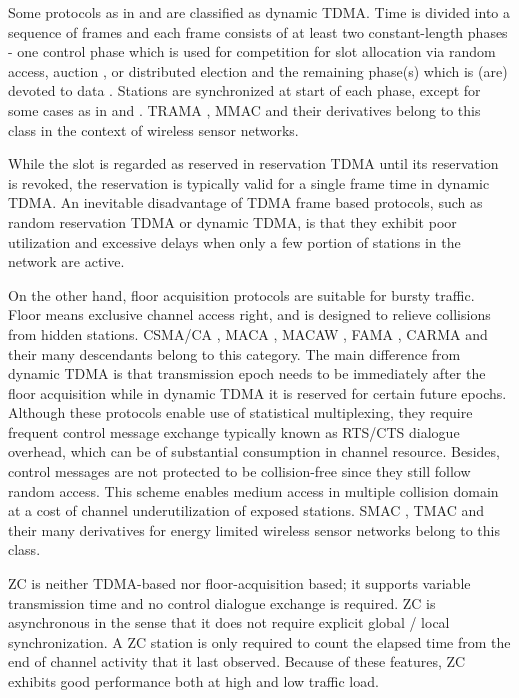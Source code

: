 \documentclass{acm_proc_article-sp}
\begin{document}
Some protocols as in \cite{1983FALK} and \cite{1993WILSON} are classified as dynamic TDMA. Time is divided into a sequence of frames and each frame consists of at least two constant-length phases - one control phase which is used for competition for slot allocation via random access, auction \cite{1994RAMA} \cite{2002MICIC} \cite{2003CSMAIC}, or distributed election \cite{2003RAJENDRAN} and the remaining phase(s) which is (are) devoted to data \cite{1993WILSON}. Stations are synchronized at start of each phase, except for some cases as in \cite{2005MMAC} and \cite{1990ZHANG}. TRAMA \cite{2003RAJENDRAN}, MMAC \cite{2005MMAC} and their derivatives belong to this class in the context of wireless sensor networks.

While the slot is regarded as reserved in reservation TDMA until its reservation is revoked, the reservation is typically valid for a single frame time in dynamic TDMA. An inevitable disadvantage of TDMA frame based protocols, such as random reservation TDMA or dynamic TDMA, is that they exhibit poor utilization and excessive delays when only a few portion of stations in the network are active.



On the other hand, floor acquisition protocols are suitable for bursty traffic. Floor means exclusive channel access right, and is designed to relieve collisions from hidden stations. CSMA/CA \cite{1997IEEE80211}, MACA \cite{1990MACA}, MACAW \cite{1994MACAW} \cite{1994MACAW2}, FAMA \cite{1995FAMA}, CARMA \cite{1998CARMA} and their many descendants belong to this category. The main difference from dynamic TDMA is that transmission epoch needs to be immediately after the floor acquisition while in dynamic TDMA it is reserved for certain future epochs. Although these protocols enable use of statistical multiplexing, they require frequent control message exchange typically known as RTS/CTS dialogue overhead, which can be of substantial consumption in channel resource. Besides, control messages are not protected to be collision-free since they still follow random access. This scheme enables medium access in multiple collision domain at a cost of channel underutilization of exposed stations.
SMAC \cite{2004SMAC}, TMAC \cite{2003TMAC} and their many derivatives for energy limited wireless sensor networks belong to this class.


ZC is neither TDMA-based nor floor-acquisition based; it supports variable transmission time and no control dialogue exchange is required. ZC is asynchronous in the sense that it does not require explicit global / local synchronization. A ZC station is only required to count the elapsed time from the end of channel activity that it last observed. Because of these features, ZC exhibits good performance both at high and low traffic load.
\end{document}
